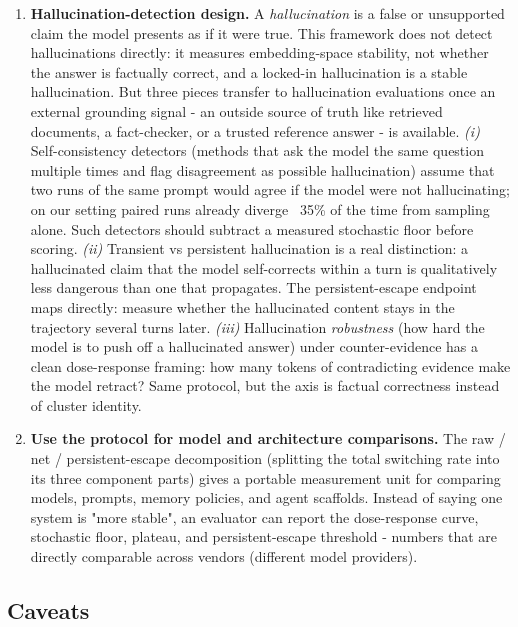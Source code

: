 \documentclass{article}
\theoremstyle{plain}
\theoremstyle{definition}
\begin{document}
\begin{enumerate}
  \item \textbf{Hallucination-detection design.} A \textit{hallucination} is a
   false or unsupported claim the model presents as if it were
   true. This framework does not detect hallucinations directly:
   it measures embedding-space stability, not whether the answer
   is factually correct, and a locked-in hallucination is a stable
   hallucination. But three pieces transfer to hallucination
   evaluations once an external grounding signal - an outside
   source of truth like retrieved documents, a fact-checker, or a
   trusted reference answer - is available. \textit{(i)} Self-consistency
   detectors (methods that ask the model the same question
   multiple times and flag disagreement as possible hallucination)
   assume that two runs of the same prompt would agree if the
   model were not hallucinating; on our setting paired runs already
   diverge ~35\% of the time from sampling alone. Such detectors
   should subtract a measured stochastic floor before scoring.
   \textit{(ii)} Transient vs persistent hallucination is a real
   distinction: a hallucinated claim that the model self-corrects
   within a turn is qualitatively less dangerous than one that
   propagates. The persistent-escape endpoint maps directly:
   measure whether the hallucinated content stays in the
   trajectory several turns later. \textit{(iii)} Hallucination
   \textit{robustness} (how hard the model is to push off a hallucinated
   answer) under counter-evidence has a clean dose-response
   framing: how many tokens of contradicting evidence make the
   model retract? Same protocol, but the axis is factual
   correctness instead of cluster identity.

  \item \textbf{Use the protocol for model and architecture comparisons.}
   The raw / net / persistent-escape decomposition (splitting the
   total switching rate into its three component parts) gives a
   portable measurement unit for comparing models, prompts, memory
   policies, and agent scaffolds. Instead of saying one system is
   "more stable", an evaluator can report the dose-response curve,
   stochastic floor, plateau, and persistent-escape threshold - 
   numbers that are directly comparable across vendors (different
   model providers).
\end{enumerate}

\subsection*{Caveats}
\end{document}
